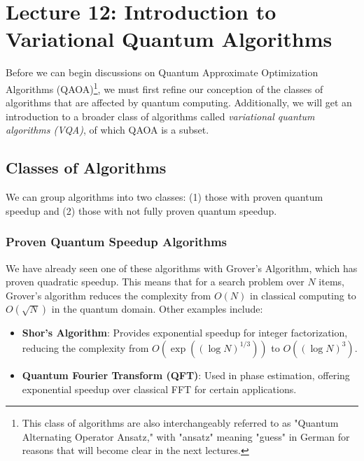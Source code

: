 \section{Lecture 12: Introduction to Variational Quantum
Algorithms}\label{sec:lecture12}

Before we can begin discussions on Quantum Approximate Optimization
Algorithms (QAOA)\footnote{This class of algorithms are also interchangeably
  referred to as "Quantum Alternating Operator Ansatz," with "ansatz" meaning
"guess" in German for reasons that will become clear in the next lectures.},
we must first refine our conception of the classes of algorithms that are
affected by quantum computing. Additionally, we will get an introduction to a
broader class of algorithms called \emph{variational quantum algorithms
(VQA)}, of which QAOA is a subset.

\subsection*{Classes of Algorithms}

We can group algorithms into two classes: (1) those with proven quantum
speedup and (2) those with not fully proven quantum speedup.

\subsubsection*{Proven Quantum Speedup Algorithms}

We have already seen one of these algorithms with Grover's Algorithm, which
has proven quadratic speedup. This means that for a search problem over $N$
items, Grover’s algorithm reduces the complexity from $O(N)$ in classical
computing to $O(\sqrt{N})$ in the quantum domain. Other examples include:

\begin{itemize}
  \item \textbf{Shor’s Algorithm}: Provides exponential speedup for integer
    factorization, reducing the complexity from $O(\exp((\log N)^{1/3}))$ to
    $O((\log N)^3)$.

  \item \textbf{Quantum Fourier Transform (QFT)}: Used in phase estimation,
    offering exponential speedup over classical FFT for certain applications.
\end{itemize}


